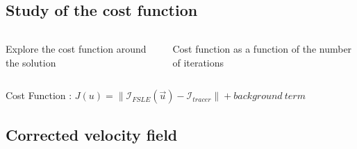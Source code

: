 \documentclass[compress,slidescentered,notes=show]{beamer}
\begin{document}
	\subsection[Cost function]{Study of the cost function}
\begin{frame}
 \centering

  \begin{center}
  \end{center}
  \begin{columns}
    \begin{column}{0.49\textwidth}
    \begin{center}
     Explore the cost function around the solution \\
     \end{center}
    \end{column}
    \begin{column}{0.49\textwidth}
     \begin{center}
     Cost function as a function of the number of iterations \\
    \end{center}
     \end{column}
     \end{columns}
 \begin{block}{}
  {Cost Function : $J(u)=\|\mathcal{I}_{FSLE}(\vec{u})- \mathcal{I}_{tracer}\| + background\ term $}
  \end{block}
\end{frame}

	\subsection{Corrected velocity field}
\begin{frame}
\end{frame}
\end{document}
